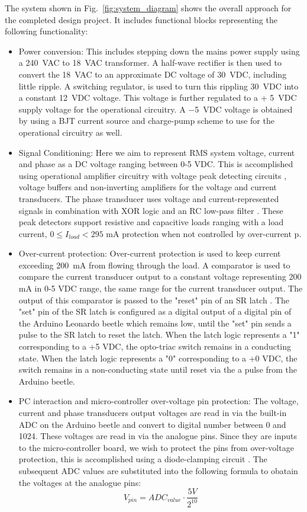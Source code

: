 The system shown in Fig.\ \ref{fig:system_diagram} shows the overall approach for the completed design project. It includes functional blocks representing the following functionality:
\begin{itemize}
    \item Power conversion: This includes stepping down the mains power supply using a \SI{240}{VAC} to  \SI{18}{VAC} transformer. A half-wave rectifier is then used to convert the \SI{18}{VAC} to an approximate DC voltage of \SI{30}{VDC}, including little ripple. A switching regulator, \cite{TI:LM2595} is used to turn this rippling \SI{30}{VDC} into a constant \SI{12}{VDC} voltage. This voltage is further regulated to a + \SI{5}{VDC} supply voltage for the operational circuitry. A \SI{-5}{VDC} voltage is obtained by using a BJT current source and charge-pump scheme to use for the operational circuitry as well.
    \item Signal Conditioning: Here we aim to represent RMS system voltage, current and phase as a DC voltage ranging between 0-5 VDC. This is accomplished using operational amplifier circuitry with voltage peak detecting circuits \cite{VPD}, voltage buffers and non-inverting amplifiers for the voltage and current transducers. The phase transducer uses voltage and current-represented signals in combination with XOR logic and an RC low-pass filter \cite{DC_Analogue}. These peak detectors support resistive and capacitive loads ranging with a load current, $0 \leq I_{load}< 295$ \si{\milli\ampere} protection when not controlled by over-current p.
    \item Over-current protection: Over-current protection is used to keep current exceeding \SI{200}{mA} from flowing through the load.  A comparator is used to compare the current transducer output to a constant voltage representing 200 mA in 0-5 VDC range, the same range for the current transducer output. The output of this comparator is passed to the "reset" pin of an SR latch \cite{SR_Latch}. The "set" pin of the SR latch is configured as a digital output of a digital pin of the Arduino Leonardo beetle \cite{beetle} which remains low, until the "set" pin sends a pulse to the SR latch to reset the latch. When the latch logic represents a "1" corresponding to a +5 VDC, the opto-triac switch remains in a conducting state. When the latch logic represents a "0" corresponding to a +0 VDC, the switch remains in a non-conducting state until reset via the a pulse from the Arduino beetle.
    \item PC interaction and micro-controller over-voltage pin protection: The voltage, current and phase transducers output voltages are read in via the built-in ADC on the Arduino beetle and convert to digital number between 0 and 1024. These voltages are read in via the analogue pins. Since they are inputs to the micro-controller board, we wish to protect the pins from over-voltage protection, this is accomplished using a diode-clamping circuit \cite{Diode_clamping}. The subsequent ADC values are substituted into the following formula to obatain the voltages at the analogue pins: $$V_{pin}=ADC_{value} \cdot \frac{5V}{2^{10}}$$

\end{itemize}
